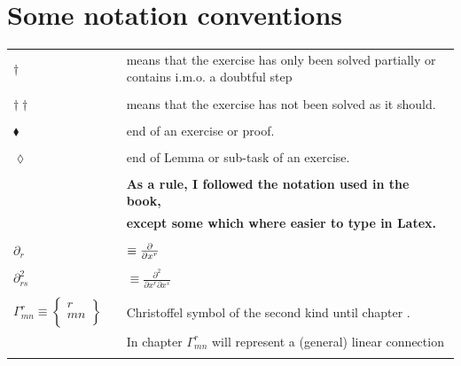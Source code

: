 \documentclass{thesis}
\newcommand{\RomanNumeralCaps}[1]{\MakeUppercase{\romannumeral #1}}
\begin{document}
\section*{Some notation conventions}

\begin{center}
\begin{tabular}{ l l }
$\dagger$& means that the exercise has only been solved partially or contains i.m.o. a doubtful step\\\\
$\dagger \dagger$& means that the exercise has not been  solved as it should.\\\\
$\blacklozenge$&end of an exercise or proof.\\\\
$\lozenge$&end of Lemma or sub-task of an exercise.\\\\
&\textbf{As a rule, I followed the notation used in the book,}\\ &\textbf{except some which where easier to type in Latex.}\\\\
$\partial_r $ &$\equiv \pdv{}{x^r}$  \\\\
$\partial^2_{rs}$  &$\equiv \frac{\partial^2}{\partial x^r \partial x^s}$ \\\\
$\Gamma^r_{mn} \equiv 
\begin{Bmatrix}
r\\
m n\\
\end{Bmatrix}\quad$  &Christoffel symbol of the second kind until chapter \RomanNumeralCaps{7}. \\
&In chapter \RomanNumeralCaps{8} $\Gamma^r_{mn}$ will represent a (general) linear connection\\\\
\end{tabular}
\end{center}

\tableofcontents
\listoffigures




\printbibliography %
\end{document}

